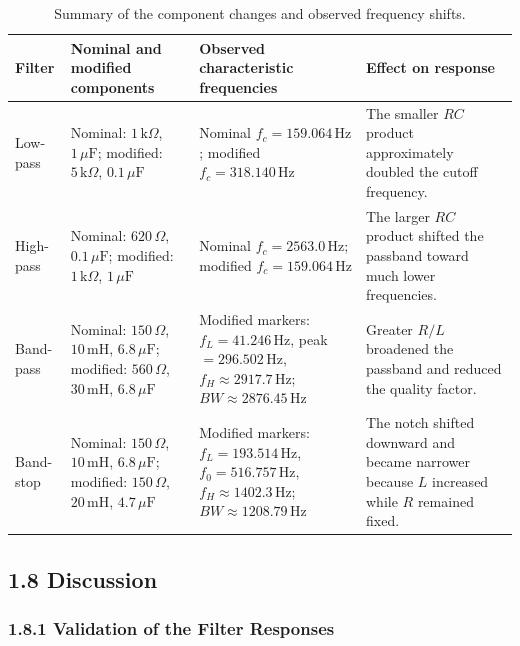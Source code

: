 \documentclass[12pt,a4paper]{article}
\begin{document}
\begin{table}[H]
  \centering
  \caption{Summary of the component changes and observed frequency shifts.}
  \label{tab:parameter-change-summary}
  \setlength{\tabcolsep}{3pt}
  \renewcommand{\arraystretch}{1.25}
  \begin{tabularx}{\textwidth}{|>{\raggedright\arraybackslash}p{}|>{\raggedright\arraybackslash}p{}|>{\raggedright\arraybackslash}p{}|>{\raggedright\arraybackslash}X|}
    \hline
    \textbf{Filter} & \textbf{Nominal and modified components} & \textbf{Observed characteristic frequencies} & \textbf{Effect on response} \\ \hline
    Low-pass & Nominal: $1\,\mathrm{k}\Omega$, $1\,\mu\mathrm{F}$; modified: $5\,\mathrm{k}\Omega$, $0.1\,\mu\mathrm{F}$ & Nominal $f_c=159.064\,\mathrm{Hz}$; modified $f_c=318.140\,\mathrm{Hz}$ & The smaller $RC$ product approximately doubled the cutoff frequency. \\ \hline
    High-pass & Nominal: $620\,\Omega$, $0.1\,\mu\mathrm{F}$; modified: $1\,\mathrm{k}\Omega$, $1\,\mu\mathrm{F}$ & Nominal $f_c=2563.0\,\mathrm{Hz}$; modified $f_c=159.064\,\mathrm{Hz}$ & The larger $RC$ product shifted the passband toward much lower frequencies. \\ \hline
    Band-pass & Nominal: $150\,\Omega$, $10\,\mathrm{mH}$, $6.8\,\mu\mathrm{F}$; modified: $560\,\Omega$, $30\,\mathrm{mH}$, $6.8\,\mu\mathrm{F}$ & Modified markers: $f_L=41.246\,\mathrm{Hz}$, peak $=296.502\,\mathrm{Hz}$, $f_H\approx2917.7\,\mathrm{Hz}$; $BW\approx2876.45\,\mathrm{Hz}$ & Greater $R/L$ broadened the passband and reduced the quality factor. \\ \hline
    Band-stop & Nominal: $150\,\Omega$, $10\,\mathrm{mH}$, $6.8\,\mu\mathrm{F}$; modified: $150\,\Omega$, $20\,\mathrm{mH}$, $4.7\,\mu\mathrm{F}$ & Modified markers: $f_L=193.514\,\mathrm{Hz}$, $f_0=516.757\,\mathrm{Hz}$, $f_H\approx1402.3\,\mathrm{Hz}$; $BW\approx1208.79\,\mathrm{Hz}$ & The notch shifted downward and became narrower because $L$ increased while $R$ remained fixed. \\ \hline
  \end{tabularx}
\end{table}

\clearpage
\subsection*{1.8 Discussion}

\subsubsection*{1.8.1 Validation of the Filter Responses}
\end{document}
